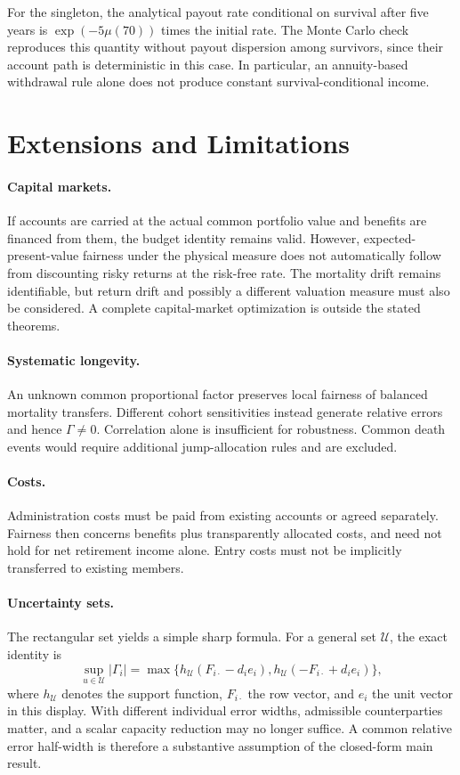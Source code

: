 \documentclass[11pt,a4paper]{article}
\theoremstyle{definition}\newtheorem{definition}[theorem]{Definition}
\theoremstyle{remark}\newtheorem{remark}[theorem]{Remark}
\begin{document}
For the singleton, the analytical payout rate conditional on survival after five years is $\exp(-5\mu(70))$ times the initial rate. The Monte Carlo check reproduces this quantity without payout dispersion among survivors, since their account path is deterministic in this case. In particular, an annuity-based withdrawal rule alone does not produce constant survival-conditional income.

\section{Extensions and Limitations}
\paragraph{Capital markets.} If accounts are carried at the actual common portfolio value and benefits are financed from them, the budget identity remains valid. However, expected-present-value fairness under the physical measure does not automatically follow from discounting risky returns at the risk-free rate. The mortality drift remains identifiable, but return drift and possibly a different valuation measure must also be considered. A complete capital-market optimization is outside the stated theorems.

\paragraph{Systematic longevity.} An unknown common proportional factor preserves local fairness of balanced mortality transfers. Different cohort sensitivities instead generate relative errors and hence $\Gamma\ne0$. Correlation alone is insufficient for robustness. Common death events would require additional jump-allocation rules and are excluded.

\paragraph{Costs.} Administration costs must be paid from existing accounts or agreed separately. Fairness then concerns benefits plus transparently allocated costs, and need not hold for net retirement income alone. Entry costs must not be implicitly transferred to existing members.

\paragraph{Uncertainty sets.} The rectangular set yields a simple sharp formula. For a general set $\mathcal U$, the exact identity is
\[
\sup_{u\in\mathcal U}|\Gamma_i|
=\max\{h_{\mathcal U}(F_{i\cdot}-d_ie_i),
         h_{\mathcal U}(-F_{i\cdot}+d_ie_i)\},
\]
where $h_{\mathcal U}$ denotes the support function, $F_{i\cdot}$ the row vector, and $e_i$ the unit vector in this display. With different individual error widths, admissible counterparties matter, and a scalar capacity reduction may no longer suffice. A common relative error half-width is therefore a substantive assumption of the closed-form main result.
\end{document}
